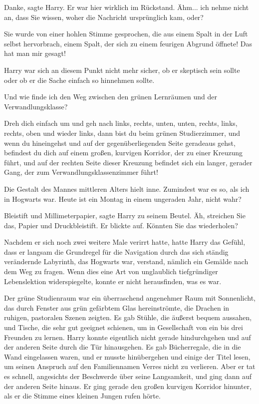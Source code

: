 \glqq Danke\grqq{}, sagte Harry. Er war hier wirklich im Rückstand. \glqq Ähm...
ich nehme nicht an, dass Sie wissen, woher die Nachricht ursprünglich kam,
oder?\grqq{}

\glqq Sie wurde von einer hohlen Stimme gesprochen, die aus einem Spalt in der
Luft selbst hervorbrach, einem Spalt, der sich zu einem feurigen Abgrund
öffnete! Das hat man mir gesagt!\grqq{}

Harry war sich an diesem Punkt nicht mehr sicher, ob er skeptisch sein sollte
oder ob er die Sache einfach so hinnehmen sollte.

\glqq Und wie finde ich den Weg zwischen den grünen Lernräumen und der
Verwandlungsklasse?\grqq{}

\glqq Dreh dich einfach um und geh nach links, rechts, unten, unten, rechts,
links, rechts, oben und wieder links, dann bist du beim grünen Studierzimmer,
und wenn du hineingehst und auf der gegenüberliegenden Seite geradeaus gehst,
befindest du dich auf einem großen, kurvigen Korridor, der zu einer Kreuzung
führt, und auf der rechten Seite dieser Kreuzung befindet sich ein langer,
gerader Gang, der zum Verwandlungsklassenzimmer führt!\grqq{}

Die Gestalt des Mannes mittleren Alters hielt inne. \glqq Zumindest war es so,
als ich in Hogwarts war. Heute ist ein Montag in einem ungeraden Jahr, nicht
wahr?\grqq{}

\glqq Bleistift und Millimeterpapier\grqq{}, sagte Harry zu seinem Beutel. \glqq
Äh, streichen Sie das, Papier und Druckbleistift.\grqq{} Er blickte auf. \glqq
Könnten Sie das wiederholen?\grqq{}

Nachdem er sich noch zwei weitere Male verirrt hatte, hatte Harry das Gefühl,
dass er langsam die Grundregel für die Navigation durch das sich ständig
verändernde Labyrinth, das Hogwarts war, verstand, nämlich ein Gemälde nach dem
Weg zu fragen. Wenn dies eine Art von unglaublich tiefgründiger Lebenslektion
widerspiegelte, konnte er nicht herausfinden, was es war.

Der grüne Studienraum war ein überraschend angenehmer Raum mit Sonnenlicht, das
durch Fenster aus grün gefärbtem Glas hereinströmte, die Drachen in ruhigen,
pastoralen Szenen zeigten. Es gab Stühle, die äußerst bequem aussahen, und
Tische, die sehr gut geeignet schienen, um in Gesellschaft von ein bis drei
Freunden zu lernen. Harry konnte eigentlich nicht gerade hindurchgehen und auf
der anderen Seite durch die Tür hinausgehen. Es gab Bücherregale, die in die
Wand eingelassen waren, und er musste hinübergehen und einige der Titel lesen,
um seinen Anspruch auf den Familiennamen Verres nicht zu verlieren. Aber er tat
es schnell, angesichts der Beschwerde über seine Langsamkeit, und ging dann auf
der anderen Seite hinaus. Er ging gerade den \glqq großen kurvigen
Korridor\grqq{} hinunter, als er die Stimme eines kleinen Jungen rufen hörte.

